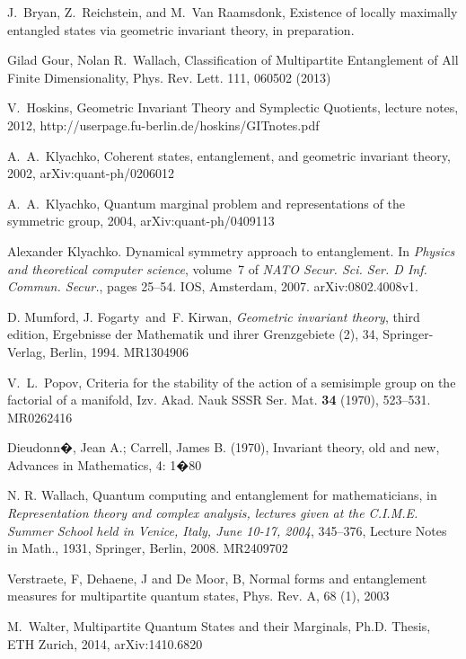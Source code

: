 \documentclass[12pt]{article}
\theoremstyle{definition}
\begin{document}

\begin{thebibliography}{AAAA}
% 

J.~Bryan,  Z.~Reichstein, and M.~Van Raamsdonk,
Existence of locally maximally entangled states via geometric invariant theory,
in preparation.



 Gilad Gour, Nolan R.~Wallach,
Classification of Multipartite Entanglement of All Finite Dimensionality,
Phys. Rev. Lett. 111, 060502 (2013)


V.~Hoskins, Geometric Invariant Theory and Symplectic Quotients,
lecture notes, 2012,
\noindent
http://userpage.fu-berlin.de/hoskins/GITnotes.pdf

A.~A.~Klyachko,  Coherent states, entanglement, and geometric invariant theory,
2002, arXiv:quant-ph/0206012

A.~A.~Klyachko,  Quantum marginal problem and representations of
the symmetric group, 2004, arXiv:quant-ph/0409113

Alexander Klyachko.
\newblock Dynamical symmetry approach to entanglement.
\newblock In {\em Physics and theoretical computer science}, volume~7 of {\em
  NATO Secur. Sci. Ser. D Inf. Commun. Secur.}, pages 25--54. IOS, Amsterdam,
  2007.
\newblock arXiv:0802.4008v1.


D. Mumford, J. Fogarty\ and\ F. Kirwan, {\it Geometric invariant theory},
third edition, Ergebnisse der Mathematik und ihrer Grenzgebiete (2), 34,
Springer-Verlag, Berlin, 1994. MR1304906

V.~L.~Popov, Criteria for the stability of the action of a semisimple
group on the factorial of a manifold, Izv. Akad. Nauk SSSR Ser.
Mat. {\bf 34} (1970), 523--531. MR0262416

Dieudonn�, Jean A.; Carrell, James B. (1970), Invariant theory, old and new, Advances in Mathematics, 4: 1�80


N. R. Wallach, Quantum computing and entanglement for mathematicians, in
{\it Representation theory and complex analysis, lectures given
at the C.I.M.E.  Summer School held in Venice, Italy, June 10-17, 2004},
345--376, Lecture Notes in Math., 1931, Springer, Berlin, 2008. MR2409702

Verstraete, F, Dehaene, J and De Moor, B,  Normal forms and entanglement measures for multipartite quantum states, Phys. Rev. A, 68 (1), 2003

M.~Walter, Multipartite Quantum States and their Marginals, Ph.D.
Thesis, ETH Zurich, 2014, arXiv:1410.6820

\end{thebibliography}
\end{document}
